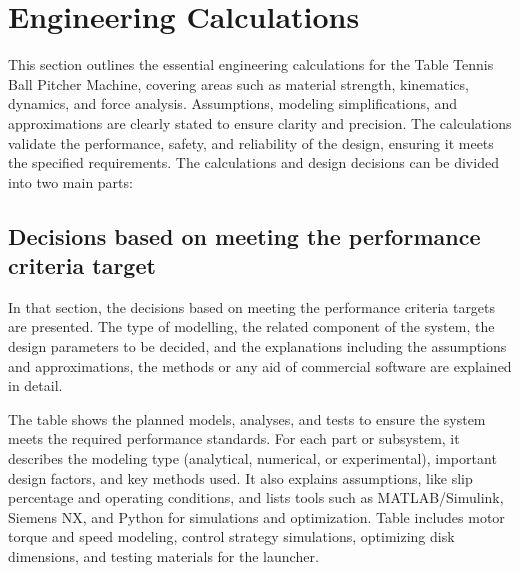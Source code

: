 \documentclass[12pt]{report}
\begin{document}
\section{Engineering Calculations}

This section outlines the essential engineering calculations for the Table Tennis Ball Pitcher Machine, covering areas such as material strength, kinematics, dynamics, and force analysis. Assumptions, modeling simplifications, and approximations are clearly stated to ensure clarity and precision. The calculations validate the performance, safety, and reliability of the design, ensuring it meets the specified requirements. 
The calculations and design decisions can be divided into two main parts:

\subsection{Decisions based on meeting the performance criteria target}

In that section, the decisions based on meeting the performance criteria targets are presented. The type of modelling, the related component of the system, the design parameters to be decided, and the explanations including the assumptions and approximations, the methods or any aid of commercial software are explained in detail.

The table shows the planned models, analyses, and tests to ensure the system meets the required performance standards. For each part or subsystem, it describes the modeling type (analytical, numerical, or experimental), important design factors, and key methods used. It also explains assumptions, like slip percentage and operating conditions, and lists tools such as MATLAB/Simulink, Siemens NX, and Python for simulations and optimization. Table includes motor torque and speed modeling, control strategy simulations, optimizing disk dimensions, and testing materials for the launcher. 
\end{document}
